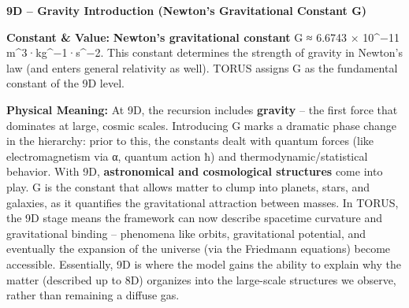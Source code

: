 \textbf{9D -- Gravity Introduction (Newton's Gravitational Constant G)}

\textbf{Constant \& Value:} \textbf{Newton's gravitational constant} G ≈
6.6743 × 10\^{}−11 m\^{}3·kg\^{}−1·s\^{}−2​. This constant determines
the strength of gravity in Newton's law (and enters general relativity
as well). TORUS assigns G as the fundamental constant of the 9D level.

\textbf{Physical Meaning:} At 9D, the recursion includes
\textbf{gravity} -- the first force that dominates at large, cosmic
scales. Introducing G marks a dramatic phase change in the hierarchy:
prior to this, the constants dealt with quantum forces (like
electromagnetism via α, quantum action ħ) and thermodynamic/statistical
behavior. With 9D, \textbf{astronomical and cosmological structures}
come into play​. G is the constant that allows matter to clump into
planets, stars, and galaxies, as it quantifies the gravitational
attraction between masses. In TORUS, the 9D stage means the framework
can now describe spacetime curvature and gravitational binding --
phenomena like orbits, gravitational potential, and eventually the
expansion of the universe (via the Friedmann equations) become
accessible. Essentially, 9D is where the model gains the ability to
explain why the matter (described up to 8D) organizes into the
large-scale structures we observe, rather than remaining a diffuse gas.

